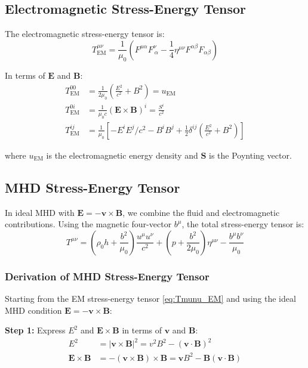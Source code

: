 \documentclass[12pt,a4paper]{article}
\begin{document}
\subsection{Electromagnetic Stress-Energy Tensor}

The electromagnetic stress-energy tensor is:
\begin{equation}
T^{\mu\nu}_\text{EM} = \frac{1}{\mu_0}\left(F^{\mu\alpha}F^\nu_{\ \alpha}
- \frac{1}{4}\eta^{\mu\nu}F^{\alpha\beta}F_{\alpha\beta}\right)
\label{eq:Tmunu_EM}
\end{equation}

In terms of $\bm{E}$ and $\bm{B}$:
\begin{align}
T^{00}_\text{EM} &= \frac{1}{2\mu_0}\left(\frac{E^2}{c^2} + B^2\right) = u_\text{EM} \label{eq:T00_EM} \\
T^{0i}_\text{EM} &= \frac{1}{\mu_0 c}(\bm{E} \times \bm{B})^i = \frac{S^i}{c^2} \label{eq:T0i_EM} \\
T^{ij}_\text{EM} &= \frac{1}{\mu_0}\left[-E^i E^j/c^2 - B^i B^j
+ \frac{1}{2}\delta^{ij}\left(\frac{E^2}{c^2} + B^2\right)\right] \label{eq:Tij_EM}
\end{align}

where $u_\text{EM}$ is the electromagnetic energy density and $\bm{S}$ is the Poynting vector.

\subsection{MHD Stress-Energy Tensor}

In ideal MHD with $\bm{E} = -\bm{v} \times \bm{B}$, we combine the fluid and
electromagnetic contributions. Using the magnetic four-vector $b^\mu$, the
total stress-energy tensor is:
\begin{equation}
\boxed{
T^{\mu\nu} = \left(\rho_0 h + \frac{b^2}{\mu_0}\right)\frac{u^\mu u^\nu}{c^2}
+ \left(p + \frac{b^2}{2\mu_0}\right)\eta^{\mu\nu}
- \frac{b^\mu b^\nu}{\mu_0}
}
\label{eq:Tmunu_MHD}
\end{equation}

\subsubsection{Derivation of MHD Stress-Energy Tensor}

Starting from the EM stress-energy tensor \eqref{eq:Tmunu_EM} and using the ideal
MHD condition $\bm{E} = -\bm{v} \times \bm{B}$:

\textbf{Step 1:} Express $E^2$ and $\bm{E} \times \bm{B}$ in terms of $\bm{v}$ and $\bm{B}$:
\begin{align}
E^2 &= |\bm{v} \times \bm{B}|^2 = v^2 B^2 - (\bm{v} \cdot \bm{B})^2 \\
\bm{E} \times \bm{B} &= -(\bm{v} \times \bm{B}) \times \bm{B}
= \bm{v}B^2 - \bm{B}(\bm{v} \cdot \bm{B})
\end{align}
\end{document}
